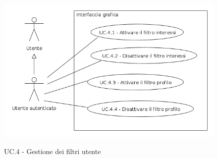 \begin{figure}[ht]
	\begin{center}
    	\includegraphics[width=12cm]{img/uc_4.png}
		\label{gfx:uc:4}
		\caption{UC.4 - Gestione dei filtri utente}
	\end{center}
\end{figure}

